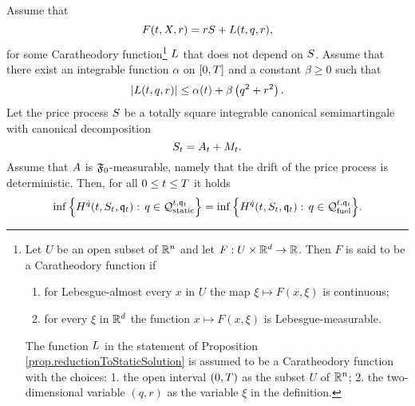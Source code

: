 \documentclass[10pt,a4paper]{article}
\begin{document}
\begin{prop}\label{prop.reductionToStaticSolution}
Assume that 
\begin{equation}\label{eq.decompositionOfLagrangian}
F(t,X,r) = rS + L(t,q,r),
\end{equation}
for some Caratheodory function\footnote{
Let $U$ be an open subset of $\mathbb{R}^{n}$ and let $F:U\times\mathbb{R}^{d} \rightarrow \mathbb{R}$. Then $F$ is said to be a Caratheodory function if
\begin{enumerate}
	\item for Lebesgue-almost every $x$ in $U$ the map $\xi \mapsto F(x,\xi)$ is continuous;
	\item for every $\xi$ in $\mathbb{R}^{d}$ the function $x\mapsto F(x,\xi)$ is Lebesgue-measurable. 
\end{enumerate}
The function $L$ in the statement of Proposition \ref{prop.reductionToStaticSolution} is assumed to be a Caratheodory function with the choices: 1. the open interval $(0,T)$ as the subset $U$ of $\mathbb{R}^{n}$; 2. the two-dimensional variable $(q,r)$ as the variable  $\xi$ in the definition.
}
$L$ that does not depend on $S$. Assume  that there exist an integrable function $\alpha$ on ${[0,T]}$  and a constant $\beta \geq 0$ such that 
\begin{equation*}
\left\lvert {L(t,q,r)} \right\rvert \leq \alpha(t) + \beta \left(q^{2} + r ^{2} \right).
\end{equation*}
Let the price process $S$ be a totally square integrable canonical semimartingale with canonical decomposition  
\begin{equation}\label{eq.evolutionOfFundamentalPrice}
S_t = A_t + M_t.
\end{equation}
Assume that $A$ is $\mathfrak{F}_0$-measurable, namely that the drift of the price process is deterministic. 
Then, for all $0\leq t\leq T$ it holds
\begin{equation*}
\inf \Big\lbrace H^{\dot{q}} (t,S_t,\mathfrak{q}_t) : \, q \in \mathcal{Q}_{\text{static}}^{t,\mathfrak{q}_t} \Big\rbrace
= \inf \Big\lbrace 
H^{\dot{q}} (t,S_t,\mathfrak{q}_t) : \, q \in \mathcal{Q}_{\text{fuel}}^{t,\mathfrak{q}_t} \Big\rbrace.
\end{equation*}
\end{prop}
\end{document}

